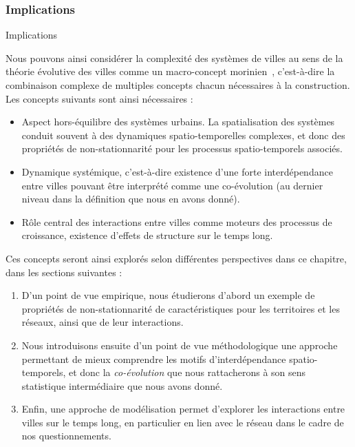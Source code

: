 \subsubsection*{Implications}{Implications}


Nous pouvons ainsi considérer la complexité des systèmes de villes au sens de la théorie évolutive des villes comme un macro-concept morinien~\cite{morin1976methode}, c'est-à-dire la combinaison complexe de multiples concepts chacun nécessaires à la construction. Les concepts suivants sont ainsi nécessaires :
\begin{itemize}
	\item Aspect hors-équilibre des systèmes urbains. La spatialisation des systèmes conduit souvent à des dynamiques spatio-temporelles complexes, et donc des propriétés de non-stationnarité pour les processus spatio-temporels associés. %
	\item Dynamique systémique, c'est-à-dire existence d'une forte interdépendance entre villes pouvant être interprété comme une co-évolution (au dernier niveau dans la définition que nous en avons donné).
	\item Rôle central des interactions entre villes comme moteurs des processus de croissance, existence d'effets de structure sur le temps long.
\end{itemize}


Ces concepts seront ainsi explorés selon différentes perspectives dans ce chapitre, dans les sections suivantes :
\begin{enumerate}
	\item D'un point de vue empirique, nous étudierons d'abord un exemple de propriétés de non-stationnarité de caractéristiques pour les territoires et les réseaux, ainsi que de leur interactions.
	\item Nous introduisons ensuite d'un point de vue méthodologique une approche permettant de mieux comprendre les motifs d'interdépendance spatio-temporels, et donc la \emph{co-évolution} que nous rattacherons à son sens statistique intermédiaire que nous avons donné.
	\item Enfin, une approche de modélisation permet d'explorer les interactions entre villes sur le temps long, en particulier en lien avec le réseau dans le cadre de nos questionnements.
\end{enumerate}




\stars






